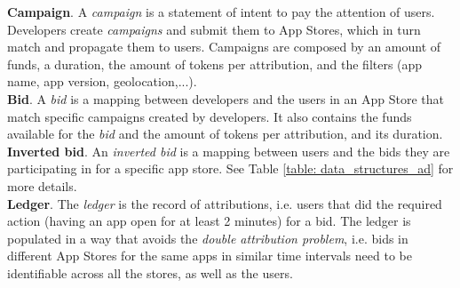 \noindent \textbf{Campaign}. A \textit{campaign} is a statement of intent to pay the attention of users. Developers create \textit{campaigns} and submit them to App Stores, which in turn match and propagate them to users. Campaigns are composed by an amount of funds, a duration, the amount of tokens per attribution, and the filters (app name, app version, geolocation,...).\\

\noindent \textbf{Bid}. A \textit{bid} is a mapping between developers and the users in an App Store that match specific campaigns created by developers. It also contains the funds available for the \textit{bid} and the amount of tokens per attribution, and its duration.\\

\noindent \textbf{Inverted bid}. An \textit{inverted bid} is a mapping between users and the bids they are participating in for a specific app store. See Table \ref{table: data_structures_ad} for more details.\\

\noindent \textbf{Ledger}. The \textit{ledger} is the record of attributions, i.e. users that did the required action (having an app open for at least 2 minutes) for a bid. The ledger is populated in a way that avoids the \textit{double attribution problem}, i.e. bids in different App Stores for the same apps in similar time intervals need to be identifiable across all the stores, as well as the users.

